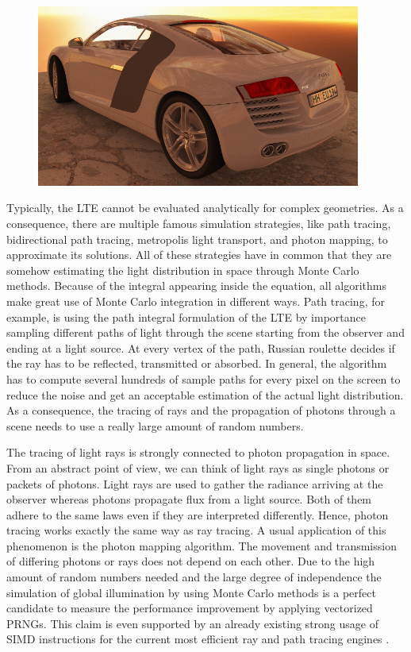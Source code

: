 \documentclass{stdlocal}
\begin{document}
    \begin{figure}
      \center
      \includegraphics[width=0.95\textwidth]{images/audi_r8_path_tracing.png}
      \caption[Path Tracing Example]{\autocite{pawellek2017}}
      \label{fig:path-tracing-r8}
    \end{figure}

    Typically, the LTE cannot be evaluated analytically for complex geometries.
    As a consequence, there are multiple famous simulation strategies, like path tracing, bidirectional path tracing, metropolis light transport, and photon mapping, to approximate its solutions.
    All of these strategies have in common that they are somehow estimating the light distribution in space through Monte Carlo methods.
    Because of the integral appearing inside the equation, all algorithms make great use of Monte Carlo integration in different ways.
    Path tracing, for example, is using the path integral formulation of the LTE by importance sampling different paths of light through the scene starting from the observer and ending at a light source.
    At every vertex of the path, Russian roulette decides if the ray has to be reflected, transmitted or absorbed.
    In general, the algorithm has to compute several hundreds of sample paths for every pixel on the screen to reduce the noise and get an acceptable estimation  of the actual light distribution.
    As a consequence, the tracing of rays and the propagation of photons through a scene needs to use a really large amount of random numbers.

    The tracing of light rays is strongly connected to photon propagation in space.
    From an abstract point of view, we can think of light rays as single photons or packets of photons.
    Light rays are used to gather the radiance arriving at the observer whereas photons propagate flux from a light source.
    Both of them adhere to the same laws even if they are interpreted differently.
    Hence, photon tracing works exactly the same way as ray tracing.
    A usual application of this phenomenon is the photon mapping algorithm.
    The movement and transmission of differing photons or rays does not depend on each other.
    Due to the high amount of random numbers needed and the large degree of independence the simulation of global illumination by using Monte Carlo methods is a perfect candidate to measure the performance improvement by applying vectorized PRNGs.
    This claim is even supported by an already existing strong usage of SIMD instructions for the current most efficient ray and path tracing engines \autocite{embree}.
\end{document}
